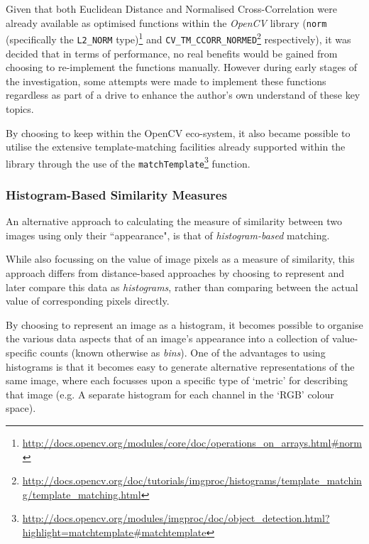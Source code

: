 Given that both Euclidean Distance and Normalised Cross-Correlation were already available as optimised functions within the \textit{OpenCV} library (\texttt{norm} (specifically the \texttt{L2\_NORM} type)\footnote{\url{http://docs.opencv.org/modules/core/doc/operations_on_arrays.html#norm}} and \texttt{CV\_TM\_CCORR\_NORMED}\footnote{\url{http://docs.opencv.org/doc/tutorials/imgproc/histograms/template_matching/template_matching.html}} respectively), it was decided that in terms of performance, no real benefits would be gained from choosing to re-implement the functions manually. However during early stages of the investigation, some attempts were made to implement these functions regardless as part of a drive to enhance the author's own understand of these key topics.

By choosing to keep within the OpenCV eco-system, it also became possible to utilise the extensive template-matching facilities already supported within the library through the use of the \texttt{matchTemplate}\footnote{\url{http://docs.opencv.org/modules/imgproc/doc/object_detection.html?highlight=matchtemplate#matchtemplate}} function.

%
%

\subsubsection{Histogram-Based Similarity Measures}

An alternative approach to calculating the measure of similarity between two images using only their ``appearance", is that of \textit{histogram-based} matching.

While also focussing on the value of image pixels as a measure of similarity, this approach differs from distance-based approaches by choosing to represent and later compare this data as \textit{histograms}, rather than comparing between the actual value of corresponding pixels directly.

By choosing to represent an image as a histogram, it becomes possible to organise the various data aspects that of an image's appearance into a collection of value-specific counts (known otherwise as \textit{bins}). One of the advantages to using histograms is that it becomes easy to generate alternative representations of the same image, where each focusses upon a specific type of `metric' for describing that image (e.g. A separate histogram for each channel in the `RGB' colour space). 

